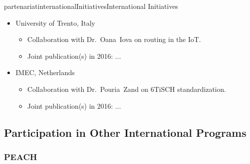 \documentclass{ra2016}
\begin{document}
\begin{module}{partenariat}{internationalInitiatives}{International Initiatives}
\begin{itemize}
    \item University of Trento, Italy
        \begin{itemize}
            \item Collaboration with Dr.~Oana~Iova on routing in the IoT.
            \item Joint publication(s) in 2016: ...
        \end{itemize}
    
    \item IMEC, Netherlands
        \begin{itemize}
            \item Collaboration with Dr.~Pouria~Zand on 6TiSCH standardization.
            \item Joint publication(s) in 2016: ...
        \end{itemize}
    
\end{itemize}


\subsection{Participation in Other International Programs}


\subsubsection{PEACH}


\end{module}
\end{document}

